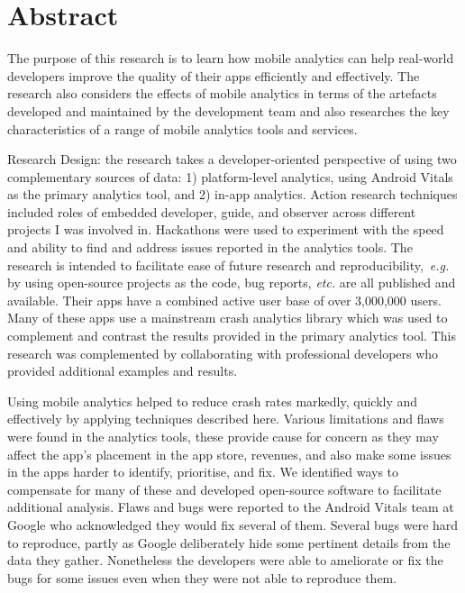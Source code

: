 \chapter*{Abstract}
\label{the-abstract}
\begin{SingleSpace}

The purpose of this research is to learn how mobile analytics can help
real-world developers improve the quality of their apps efficiently and effectively. The research also considers the effects of mobile analytics in terms of the artefacts developed and maintained by the development team and also researches the key characteristics of a range of mobile analytics tools and services. %

Research Design: the research takes a developer-oriented perspective of using two complementary sources of data: 1) platform-level analytics, using Android Vitals as the primary analytics tool, and 2) in-app analytics.
%
Action research techniques included roles of embedded developer, guide, and observer across different projects I was involved in. Hackathons were used to experiment with the speed and ability to find and address issues reported in the analytics tools. 
%
The research is intended to facilitate ease of future research and reproducibility,~\emph{e.g.} by using  open-source projects as the code, bug reports, \emph{etc.} are all published and available. Their apps have a combined active user base of over 3,000,000 users. Many of these apps use a mainstream crash analytics library which was used to complement and contrast the results provided in the primary analytics tool.
%
This research was complemented by collaborating with professional developers who provided additional examples and results.

Using mobile analytics helped to reduce crash rates markedly, quickly and effectively by applying techniques described here.
Various limitations and flaws were found in the analytics tools, these provide cause for concern as they may affect the app's placement in the app store, revenues, and also make some issues in the apps harder to identify, prioritise, and fix. We identified ways to compensate for many of these and developed open-source software to facilitate additional analysis. Flaws and bugs were reported to the Android Vitals team at Google who acknowledged they would fix several of them.
%
Several bugs were hard to reproduce, partly as Google deliberately hide some pertinent details from the data they gather. Nonetheless the developers were able to ameliorate or fix the bugs for some issues even when they were not able to reproduce them. 


\end{SingleSpace}

